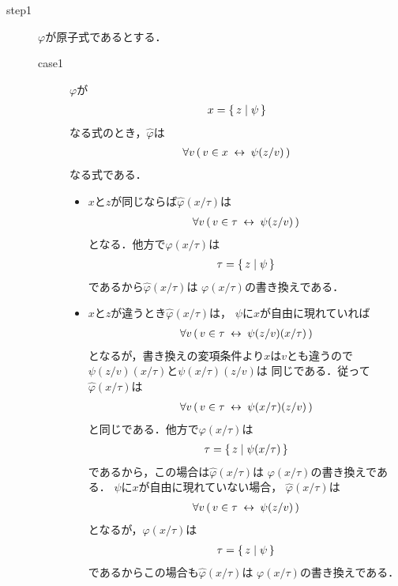 	\begin{metaprf}\mbox{}
		\begin{description}
			\item[step1] $\varphi$が原子式であるとする．
				\begin{description}
					\item[case1] $\varphi$が
						\begin{align}
							x = \{\, z \mid \psi\, \}
						\end{align}
						なる式のとき，$\widehat{\varphi}$は
						\begin{align}
							\forall v\, (\, v \in x \hspace{0.25em}\leftrightarrow\hspace{0.25em} \psi(z/v)\, )
						\end{align}
						なる式である．
						\begin{itemize}
							\item $x$と$z$が同じならば$\widehat{\varphi}(x/\tau)$は
								\begin{align}
									\forall v\, (\, v \in \tau \hspace{0.25em}\leftrightarrow\hspace{0.25em} \psi(z/v)\, )
								\end{align}
								となる．他方で$\varphi(x/\tau)$は
								\begin{align}
									\tau = \{\, z \mid \psi\, \}
								\end{align}
								であるから$\widehat{\varphi}(x/\tau)$は
								$\varphi(x/\tau)$の書き換えである．
								
							\item $x$と$z$が違うとき$\widehat{\varphi}(x/\tau)$は，
								$\psi$に$x$が自由に現れていれば
								\begin{align}
									\forall v\, (\, v \in \tau \hspace{0.25em}\leftrightarrow\hspace{0.25em} \psi(z/v)(x/\tau)\, )
								\end{align}
								となるが，書き換えの変項条件より$x$は$v$とも違うので
								$\psi(z/v)(x/\tau)$と$\psi(x/\tau)(z/v)$は
								同じである．従って$\widehat{\varphi}(x/\tau)$は
								\begin{align}
									\forall v\, (\, v \in \tau \hspace{0.25em}\leftrightarrow\hspace{0.25em} \psi(x/\tau)(z/v)\, )
								\end{align}
								と同じである．他方で$\varphi(x/\tau)$は
								\begin{align}
									\tau = \{\, z \mid \psi(x/\tau)\, \}
								\end{align}
								であるから，この場合は$\widehat{\varphi}(x/\tau)$は
								$\varphi(x/\tau)$の書き換えである．
								$\psi$に$x$が自由に現れていない場合，
								$\widehat{\varphi}(x/\tau)$は
								\begin{align}
									\forall v\, (\, v \in \tau \hspace{0.25em}\leftrightarrow\hspace{0.25em} \psi(z/v)\, )
								\end{align}
								となるが，$\varphi(x/\tau)$は
								\begin{align}
									\tau = \{\, z \mid \psi\, \}
								\end{align}
								であるからこの場合も$\widehat{\varphi}(x/\tau)$は
								$\varphi(x/\tau)$の書き換えである．
						\end{itemize}
						

\end{description}
\end{description}
\end{metaprf}
